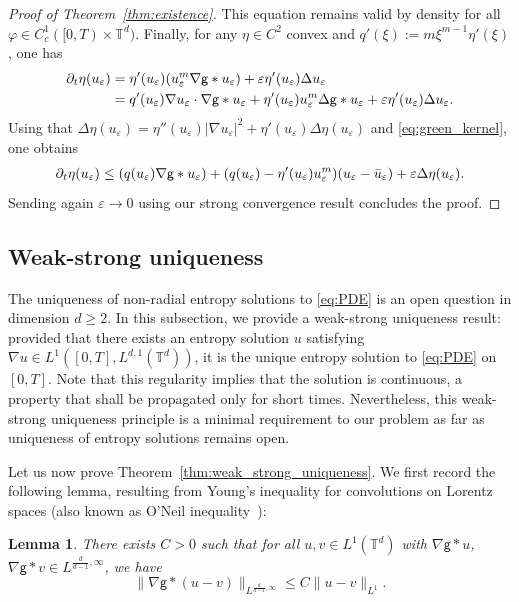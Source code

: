 \documentclass[11pt]{article}
\newtheorem{lemma}[thm]{Lemma}
\numberwithin{equation}{section} %
\newcommand{\p}{{\partial}}
\newcommand{\T}{{\mathbb{T}}}
\newcommand{\g}{{\mathsf{g}}}
\newcommand{\D}{\Delta}
\newcommand{\ep}{\varepsilon}
\let\div\relax
\DeclareMathOperator{\div}{\mathsf{div}}
\def \ep{\varepsilon}
\def\nab{\nabla}
\begin{document}
\begin{proof}[Proof of Theorem~\ref{thm:existence}]
This equation remains valid by density for all $\varphi \in C_c^{1}([0,T)\times\T^d)$.
Finally, for any $\eta\in C^2$ convex and $q'(\xi) := m\xi^{m-1} \eta'(\xi)$, one has
\begin{align*}
    \p_t \eta(u_\ep) &= \eta'(u_\ep) \div(u_\ep^m\nab\g\ast u_\ep) + \ep \eta'(u_\ep) \D u_\ep \\
    &= q'(u_\ep) \nab u_\ep\cdot\nab\g\ast u_\ep + \eta'(u_\ep) u_\ep^m \D\g\ast u_\ep  + \ep \eta'(u_\ep) \D u_\ep .
\end{align*}
Using that $\D \eta(u_\ep ) = \eta ''(u_\ep) |\nab u_\ep|^2 + \eta'(u_\ep) \D \eta (u_\ep)$ and \eqref{eq:green_kernel}, one obtains
\begin{align*}
     \p_t \eta(u_\ep) \le \div (q(u_\ep)\nab\g\ast u_\ep) + (q(u_\ep) - \eta'(u_\ep) u_\ep^m ) (u_\ep-\bar u_\ep) + \ep \D \eta (u_\ep).
\end{align*}
Sending again $\ep\to 0$ using our strong convergence result concludes the proof.
\end{proof}


\subsection{Weak-strong uniqueness}

The uniqueness of non-radial entropy solutions to \eqref{eq:PDE} is an open question in dimension $d\ge 2$. In this subsection, we provide a weak-strong uniqueness result: provided that there exists an entropy solution $u$ satisfying $\nab u\in L^1([0,T], L^{d,1}(\T^d))$, it is the unique entropy solution to \eqref{eq:PDE} on $[0,T]$. Note that this regularity implies that the solution is continuous, a property that shall be propagated only for short times. Nevertheless, this weak-strong uniqueness principle is a minimal requirement to our problem as far as uniqueness of entropy solutions remains open.

Let us now prove Theorem~\ref{thm:weak_strong_uniqueness}. We first record the following lemma, resulting from Young's inequality for convolutions on Lorentz spaces (also known as O'Neil inequality~\cite{MR146673}):

\begin{lemma}\label{lem:O'Neil}
There exists $C>0$ such that for all $u,v \in L^{1}(\T^d)$ with $\nabla \g\ast u$, $\nabla \g\ast v \in L^{\frac{d}{d-1},\infty}$, we have
 $$
 \|\nabla \g\ast (u-v)\|_{L^{\frac{d}{d-1},\infty}}\le C\|u-v\|_{L^{1}}.
 $$
\end{lemma}
\end{document}
